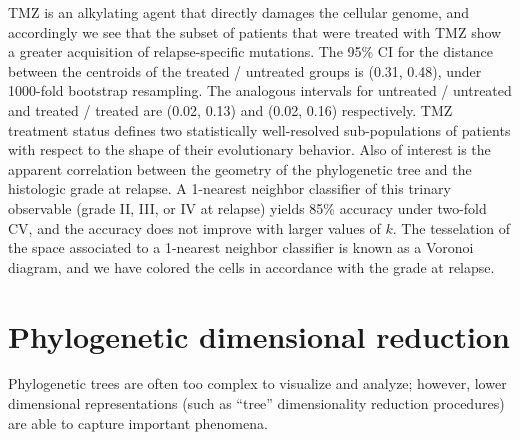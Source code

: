 \documentclass[a4paper,11pt]{article}
\begin{document}
TMZ is an alkylating agent that directly damages the cellular genome, and accordingly we see that the subset of patients that were treated with TMZ show a greater acquisition of relapse-specific mutations.
The 95\% CI for the distance between the centroids of the treated / untreated groups is (0.31, 0.48), under 1000-fold bootstrap resampling.
The analogous intervals for untreated / untreated and treated / treated are (0.02, 0.13) and (0.02, 0.16) respectively.
TMZ treatment status defines two statistically well-resolved sub-populations of patients with respect to the shape of their evolutionary behavior.
Also of interest is the apparent correlation between the geometry of the phylogenetic tree and the histologic grade at relapse.
A 1-nearest neighbor classifier of this trinary observable (grade II, III, or IV at relapse) yields 85\% accuracy under two-fold CV, and the accuracy does not improve with larger values of $k$.
The tesselation of the space associated to a 1-nearest neighbor classifier is known as a Voronoi diagram, and we have colored the cells in accordance with the grade at relapse.


\section{Phylogenetic dimensional reduction}\label{sec:flu}

Phylogenetic trees are often too complex to visualize and analyze; however, lower dimensional representations (such as ``tree'' dimensionality reduction procedures) are able to capture important phenomena. 
\end{document}
